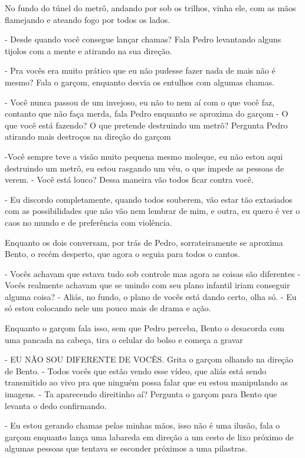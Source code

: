 No fundo do túnel do metrô, andando por sob os trilhos, vinha ele, com as mãos flamejando e ateando fogo por todos os lados.

- Desde quando você consegue lançar chamas? Fala Pedro levantando alguns tijolos com a mente e atirando na sua direção.

- Pra vocês era muito prático que eu não pudesse fazer nada de mais não é mesmo? Fala o garçom, enquanto desvia os entulhos com algumas chamas. 

- Você nunca passou de um invejoso, eu não to nem aí com o que você faz, contanto que não faça merda, fala Pedro enquanto se aproxima do garçom - O que você está fazendo? O que pretende destruindo um metrô? Pergunta Pedro atirando mais destroços na direção do garçom

-Você sempre teve a visão muito pequena mesmo moleque, eu não estou aqui destruindo um metrô, eu estou rasgando um véu, o que impede as pessoas de verem.
- Você está louco? Dessa maneira vão todos ficar contra você.

- Eu discordo completamente, quando todos souberem, vão estar tão extasiados com as possibilidades que não vão nem lembrar de mim, e outra, eu quero é ver o caos no mundo e de preferência com violência.


Enquanto os dois conversam, por trás de Pedro, sorrateiramente se aproxima Bento, o recém desperto, que agora o seguia para todos o cantos.

- Vocês achavam que estava tudo sob controle mas agora as coisas são diferentes - Vocês realmente achavam que se unindo com seu plano infantil iriam conseguir alguma coisa? - Aliás, no fundo, o plano de vocês está dando certo, olha só. - Eu só estou colocando nele um pouco mais de drama e ação.


Enquanto o garçom fala isso, sem que Pedro perceba, Bento o desacorda com uma pancada na cabeça, tira o celular do bolso e começa a gravar

- EU NÃO SOU DIFERENTE DE VOCÊS. Grita o garçom olhando na direção de Bento. - Todos vocês que estão vendo esse vídeo, que aliás está sendo transmitido ao vivo pra que ninguém possa falar que eu estou manipulando as imagens. - Ta aparecendo direitinho aí? Pergunta o garçom para Bento que levanta o dedo confirmando.


- Eu estou gerando chamas pelas minhas mãos, isso não é uma ilusão, fala o garçom enquanto lança uma labareda em direção a um cesto de lixo próximo de algumas pessoas que tentava se esconder próximos a uma pilastras.


